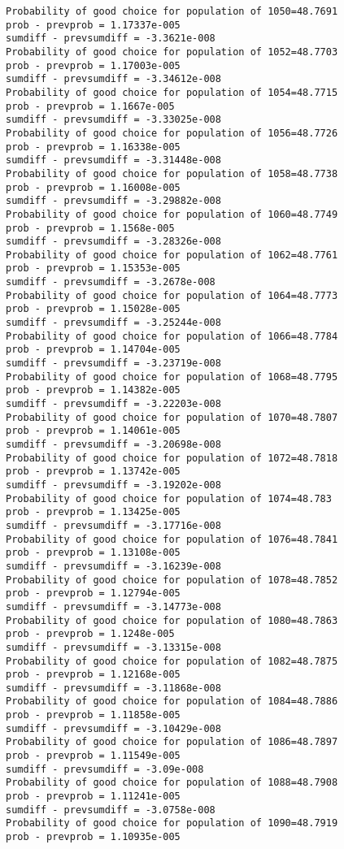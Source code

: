 \documentclass[11pt,onecolumn]{article}
\begin{document}
\begin{verbatim}
Probability of good choice for population of 1050=48.7691
prob - prevprob = 1.17337e-005
sumdiff - prevsumdiff = -3.3621e-008
Probability of good choice for population of 1052=48.7703
prob - prevprob = 1.17003e-005
sumdiff - prevsumdiff = -3.34612e-008
Probability of good choice for population of 1054=48.7715
prob - prevprob = 1.1667e-005
sumdiff - prevsumdiff = -3.33025e-008
Probability of good choice for population of 1056=48.7726
prob - prevprob = 1.16338e-005
sumdiff - prevsumdiff = -3.31448e-008
Probability of good choice for population of 1058=48.7738
prob - prevprob = 1.16008e-005
sumdiff - prevsumdiff = -3.29882e-008
Probability of good choice for population of 1060=48.7749
prob - prevprob = 1.1568e-005
sumdiff - prevsumdiff = -3.28326e-008
Probability of good choice for population of 1062=48.7761
prob - prevprob = 1.15353e-005
sumdiff - prevsumdiff = -3.2678e-008
Probability of good choice for population of 1064=48.7773
prob - prevprob = 1.15028e-005
sumdiff - prevsumdiff = -3.25244e-008
Probability of good choice for population of 1066=48.7784
prob - prevprob = 1.14704e-005
sumdiff - prevsumdiff = -3.23719e-008
Probability of good choice for population of 1068=48.7795
prob - prevprob = 1.14382e-005
sumdiff - prevsumdiff = -3.22203e-008
Probability of good choice for population of 1070=48.7807
prob - prevprob = 1.14061e-005
sumdiff - prevsumdiff = -3.20698e-008
Probability of good choice for population of 1072=48.7818
prob - prevprob = 1.13742e-005
sumdiff - prevsumdiff = -3.19202e-008
Probability of good choice for population of 1074=48.783
prob - prevprob = 1.13425e-005
sumdiff - prevsumdiff = -3.17716e-008
Probability of good choice for population of 1076=48.7841
prob - prevprob = 1.13108e-005
sumdiff - prevsumdiff = -3.16239e-008
Probability of good choice for population of 1078=48.7852
prob - prevprob = 1.12794e-005
sumdiff - prevsumdiff = -3.14773e-008
Probability of good choice for population of 1080=48.7863
prob - prevprob = 1.1248e-005
sumdiff - prevsumdiff = -3.13315e-008
Probability of good choice for population of 1082=48.7875
prob - prevprob = 1.12168e-005
sumdiff - prevsumdiff = -3.11868e-008
Probability of good choice for population of 1084=48.7886
prob - prevprob = 1.11858e-005
sumdiff - prevsumdiff = -3.10429e-008
Probability of good choice for population of 1086=48.7897
prob - prevprob = 1.11549e-005
sumdiff - prevsumdiff = -3.09e-008
Probability of good choice for population of 1088=48.7908
prob - prevprob = 1.11241e-005
sumdiff - prevsumdiff = -3.0758e-008
Probability of good choice for population of 1090=48.7919
prob - prevprob = 1.10935e-005

\end{verbatim}
\end{document}
